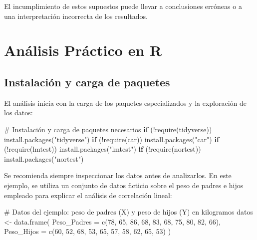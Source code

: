 \documentclass[
  spanish,
  letterpaper,
]{book}
\newenvironment{Shaded}{\begin{snugshade}}{\end{snugshade}}
\newcommand{\AttributeTok}[1]{\textcolor[rgb]{0.40,0.45,0.13}{#1}}
\newcommand{\CommentTok}[1]{\textcolor[rgb]{0.37,0.37,0.37}{#1}}
\newcommand{\ControlFlowTok}[1]{\textcolor[rgb]{0.00,0.23,0.31}{\textbf{#1}}}
\newcommand{\DecValTok}[1]{\textcolor[rgb]{0.68,0.00,0.00}{#1}}
\newcommand{\FunctionTok}[1]{\textcolor[rgb]{0.28,0.35,0.67}{#1}}
\newcommand{\NormalTok}[1]{\textcolor[rgb]{0.00,0.23,0.31}{#1}}
\newcommand{\OtherTok}[1]{\textcolor[rgb]{0.00,0.23,0.31}{#1}}
\newcommand{\SpecialCharTok}[1]{\textcolor[rgb]{0.37,0.37,0.37}{#1}}
\newcommand{\StringTok}[1]{\textcolor[rgb]{0.13,0.47,0.30}{#1}}
\begin{document}
El incumplimiento de estos supuestos puede llevar a conclusiones
erróneas o a una interpretación incorrecta de los resultados.

\section{Análisis Práctico en R}\label{anuxe1lisis-pruxe1ctico-en-r}

\subsection{Instalación y carga de
paquetes}\label{instalaciuxf3n-y-carga-de-paquetes-1}

El análisis inicia con la carga de los paquetes especializados y la
exploración de los datos:

\begin{Shaded}
\begin{Highlighting}[]
\CommentTok{\# Instalación y carga de paquetes necesarios}
\ControlFlowTok{if}\NormalTok{ (}\SpecialCharTok{!}\FunctionTok{require}\NormalTok{(tidyverse)) }\FunctionTok{install.packages}\NormalTok{(}\StringTok{"tidyverse"}\NormalTok{)}
\ControlFlowTok{if}\NormalTok{ (}\SpecialCharTok{!}\FunctionTok{require}\NormalTok{(car)) }\FunctionTok{install.packages}\NormalTok{(}\StringTok{"car"}\NormalTok{)}
\ControlFlowTok{if}\NormalTok{ (}\SpecialCharTok{!}\FunctionTok{require}\NormalTok{(lmtest)) }\FunctionTok{install.packages}\NormalTok{(}\StringTok{"lmtest"}\NormalTok{)}
\ControlFlowTok{if}\NormalTok{ (}\SpecialCharTok{!}\FunctionTok{require}\NormalTok{(nortest)) }\FunctionTok{install.packages}\NormalTok{(}\StringTok{"nortest"}\NormalTok{)}
\end{Highlighting}
\end{Shaded}

Se recomienda siempre inspeccionar los datos antes de analizarlos. En
este ejemplo, se utiliza un conjunto de datos ficticio sobre el peso de
padres e hijos empleado para explicar el análisis de correlación lineal:

\begin{Shaded}
\begin{Highlighting}[]
\CommentTok{\# Datos del ejemplo: peso de padres (X) y peso de hijos (Y) en kilogramos}
\NormalTok{datos }\OtherTok{\textless{}{-}} \FunctionTok{data.frame}\NormalTok{(}
  \AttributeTok{Peso\_Padres =} \FunctionTok{c}\NormalTok{(}\DecValTok{78}\NormalTok{, }\DecValTok{65}\NormalTok{, }\DecValTok{86}\NormalTok{, }\DecValTok{68}\NormalTok{, }\DecValTok{83}\NormalTok{, }\DecValTok{68}\NormalTok{, }\DecValTok{75}\NormalTok{, }\DecValTok{80}\NormalTok{, }\DecValTok{82}\NormalTok{, }\DecValTok{66}\NormalTok{),}
  \AttributeTok{Peso\_Hijos =} \FunctionTok{c}\NormalTok{(}\DecValTok{60}\NormalTok{, }\DecValTok{52}\NormalTok{, }\DecValTok{68}\NormalTok{, }\DecValTok{53}\NormalTok{, }\DecValTok{65}\NormalTok{, }\DecValTok{57}\NormalTok{, }\DecValTok{58}\NormalTok{, }\DecValTok{62}\NormalTok{, }\DecValTok{65}\NormalTok{, }\DecValTok{53}\NormalTok{)}
\NormalTok{)}
\end{Highlighting}
\end{Shaded}
\end{document}

